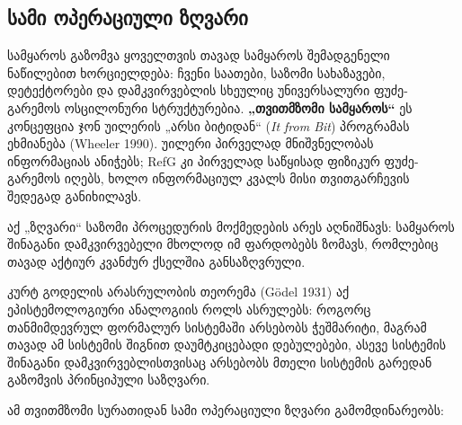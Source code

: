 \documentclass[11pt,a4paper]{article}
\begin{document}
\subsection{სამი ოპერაციული ზღვარი}

სამყაროს გაზომვა ყოველთვის თავად სამყაროს შემადგენელი ნაწილებით ხორციელდება: ჩვენი საათები, საზომი სახაზავები, დეტექტორები და დამკვირვებლის სხეულიც უნივერსალური ფუძე-გარემოს ოსცილონური სტრუქტურებია. \textbf{„თვითმზომი სამყაროს“} ეს კონცეფცია ჯონ უილერის „არსი ბიტიდან“ (\emph{It from Bit}) პროგრამას ეხმიანება (Wheeler 1990). უილერი პირველად მნიშვნელობას ინფორმაციას ანიჭებს; RefG კი პირველად საწყისად ფიზიკურ ფუძე-გარემოს იღებს, ხოლო ინფორმაციულ კვალს მისი თვითგარჩევის შედეგად განიხილავს.

აქ „ზღვარი“ საზომი პროცედურის მოქმედების არეს აღნიშნავს: სამყაროს შინაგანი დამკვირვებელი მხოლოდ იმ ფარდობებს ზომავს, რომლებიც თავად აქტიურ კვანძურ ქსელშია განსაზღვრული.

კურტ გოდელის არასრულობის თეორემა (Gödel 1931) აქ ეპისტემოლოგიური ანალოგიის როლს ასრულებს: როგორც თანმიმდევრულ ფორმალურ სისტემაში არსებობს ჭეშმარიტი, მაგრამ თავად ამ სისტემის შიგნით დაუმტკიცებადი დებულებები, ასევე სისტემის შინაგანი დამკვირვებლისთვისაც არსებობს მთელი სისტემის გარედან გაზომვის პრინციპული საზღვარი.

ამ თვითმზომი სურათიდან სამი ოპერაციული ზღვარი გამომდინარეობს:
\end{document}
